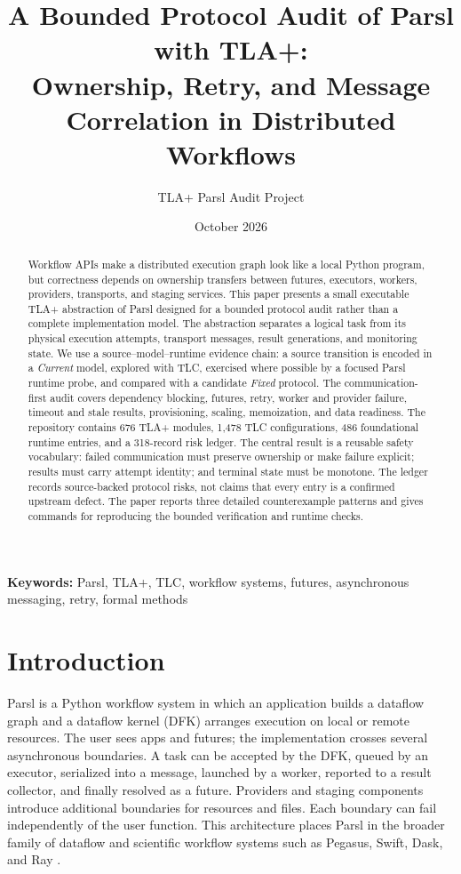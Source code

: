 \documentclass[11pt,a4paper]{article}
\title{A Bounded Protocol Audit of Parsl with TLA+:\\
\large Ownership, Retry, and Message Correlation in Distributed Workflows}
\author{TLA+ Parsl Audit Project}
\date{October 2026}
\begin{document}
\maketitle

\begin{abstract}
Workflow APIs make a distributed execution graph look like a local Python program, but correctness
depends on ownership transfers between futures, executors, workers, providers, transports, and
staging services. This paper presents a small executable TLA+ abstraction of Parsl designed for a
bounded protocol audit rather than a complete implementation model. The abstraction separates a
logical task from its physical execution attempts, transport messages, result generations, and
monitoring state. We use a source--model--runtime evidence chain: a source transition is encoded
in a \emph{Current} model, explored with TLC, exercised where possible by a focused Parsl runtime
probe, and compared with a candidate \emph{Fixed} protocol. The communication-first audit covers
dependency blocking, futures, retry, worker and provider failure, timeout and stale results,
provisioning, scaling, memoization, and data readiness. The repository contains 676 TLA+ modules,
1,478 TLC configurations, 486 foundational runtime entries, and a 318-record risk ledger. The
central result is a reusable safety vocabulary: failed communication must preserve ownership or
make failure explicit; results must carry attempt identity; and terminal state must be monotone.
The ledger records source-backed protocol risks, not claims that every entry is a confirmed upstream
defect. The paper reports three detailed counterexample patterns and gives commands for reproducing
the bounded verification and runtime checks.
\end{abstract}

\noindent\textbf{Keywords:} Parsl, TLA+, TLC, workflow systems, futures, asynchronous messaging,
retry, formal methods

\section{Introduction}
Parsl is a Python workflow system in which an application builds a dataflow graph and a dataflow
kernel (DFK) arranges execution on local or remote resources. The user sees apps and futures; the
implementation crosses several asynchronous boundaries. A task can be accepted by the DFK, queued
by an executor, serialized into a message, launched by a worker, reported to a result collector, and
finally resolved as a future. Providers and staging components introduce additional boundaries for
resources and files. Each boundary can fail independently of the user function. This architecture
places Parsl in the broader family of dataflow and scientific workflow systems such as Pegasus,
Swift, Dask, and Ray \cite{babuji2019parsl,deelman2015pegasus,wilde2011swift,rocklin2015dask,moritz2018ray}.
\end{document}
